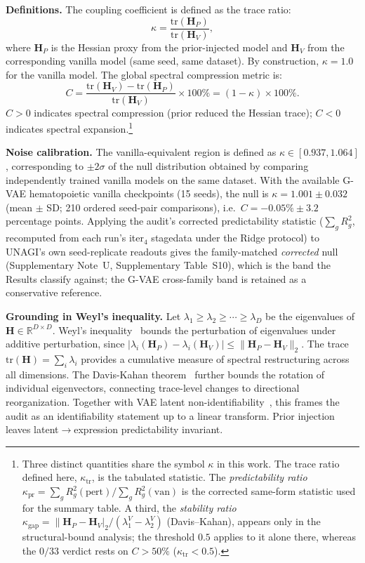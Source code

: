 \textbf{Definitions.} The coupling coefficient is defined as the trace ratio:
\begin{equation}
\kappa = \frac{\mathrm{tr}(\mathbf{H}_P)}{\mathrm{tr}(\mathbf{H}_V)},
\end{equation}
where $\mathbf{H}_P$ is the Hessian proxy from the prior-injected model and $\mathbf{H}_V$ from the corresponding vanilla model (same seed, same dataset). By construction, $\kappa=1.0$ for the vanilla model. The global spectral compression metric is:
\begin{equation}
C = \frac{\mathrm{tr}(\mathbf{H}_V) - \mathrm{tr}(\mathbf{H}_P)}{\mathrm{tr}(\mathbf{H}_V)} \times 100\% = (1-\kappa)\times 100\%.
\end{equation}
$C>0$ indicates spectral compression (prior reduced the Hessian trace); $C<0$ indicates spectral expansion.\footnote{Three distinct quantities share the symbol $\kappa$ in this work. The trace ratio defined here, $\kappa_{\mathrm{tr}}$, is the tabulated statistic. The \emph{predictability ratio} $\kappa_{\mathrm{pr}}=\sum_g R^2_g(\text{pert})/\sum_g R^2_g(\text{van})$ is the corrected same-form statistic used for the summary table. A third, the \emph{stability ratio} $\kappa_{\mathrm{gap}}=\|\mathbf{H}_P-\mathbf{H}_V|_2/(\lambda_1^V-\lambda_2^V)$ (Davis--Kahan), appears only in the structural-bound analysis; the threshold $0.5$ applies to it alone there, whereas the $0/33$ verdict rests on $C>50\%$ ($\kappa_{\mathrm{tr}}<0.5$).}

\textbf{Noise calibration.} The vanilla-equivalent region is defined as $\kappa \in [0.937, 1.064]$, corresponding to $\pm2\sigma$ of the null distribution obtained by comparing independently trained vanilla models on the same dataset. With the available G-VAE hematopoietic vanilla checkpoints (15 seeds), the null is $\kappa=1.001\pm0.032$ (mean $\pm$ SD; 210 ordered seed-pair comparisons), i.e.\ $C=-0.05\%\pm3.2$ percentage points. Applying the audit's corrected predictability statistic ($\sum_g R^2_g$, recomputed from each run's iter$_4$ stagedata under the Ridge protocol) to UNAGI's own seed-replicate readouts gives the family-matched \emph{corrected} null (Supplementary Note~U, Supplementary Table~S10), which is the band the Results classify against; the G-VAE cross-family band is retained as a conservative reference.

\textbf{Grounding in Weyl's inequality.} Let $\lambda_1 \geq \lambda_2 \geq \cdots \geq \lambda_D$ be the eigenvalues of $\mathbf{H}\in\mathbb{R}^{D\times D}$. Weyl's inequality~\cite{weyl1912} bounds the perturbation of eigenvalues under additive perturbation, since $|\lambda_i(\mathbf{H}_P) - \lambda_i(\mathbf{H}_V)| \leq \|\mathbf{H}_P - \mathbf{H}_V\|_2$. The trace $\mathrm{tr}(\mathbf{H}) = \sum_i \lambda_i$ provides a cumulative measure of spectral restructuring across all dimensions. The Davis-Kahan theorem~\cite{davis1970} further bounds the rotation of individual eigenvectors, connecting trace-level changes to directional reorganization. Together with VAE latent non-identifiability~\cite{khemakhem2020}, this frames the audit as an identifiability statement up to a linear transform. Prior injection leaves latent$\to$expression predictability invariant.

